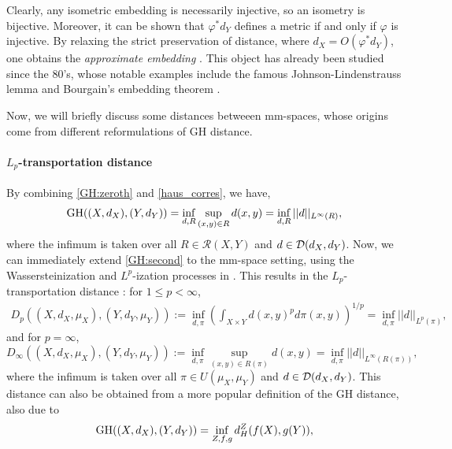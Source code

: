 Clearly, any isometric embedding is necessarily injective, so an isometry is bijective.
Moreover, it can be shown that $\varphi^* d_Y$ defines a metric if and
only if $\varphi$ is injective. By relaxing the strict preservation of distance,
where $d_X = O(\varphi^* d_Y)$, one obtains the \textit{approximate embedding} \citep{Matousek13}.
This object has already been studied since the 80's, whose notable examples include the famous
Johnson-Lindenstrauss lemma \citep{Johnson84} and Bourgain's embedding theorem \citep{Bourgain85}.

Now, we will briefly discuss some distances betweeen mm-spaces, whose origins come from
different reformulations of GH distance.
\paragraph{$L_p$-transportation distance}
By combining \eqref{GH:zeroth} and \eqref{haus_corres}, we have,
\begin{equation}
  \label{GH:second}
    \text{GH}((X,d_X), (Y,d_Y)) = \inf_{d, R} \sup_{(x,y) \in R} d(x,y) =
    \inf_{d,R} || d ||_{L^{\infty}(R)},
\end{equation}
where the infimum is taken over all $R \in \mathcal R(X,Y)$ and $d \in \mathcal D(d_X, d_Y)$.
Now, we can immediately extend \eqref{GH:second} to the mm-space setting,
using the Wassersteinization and $L^p$-ization processes in .
This results in the $L_p$-transportation distance \citep{Sturm06}: for $1 \leq p < \infty$,
\begin{equation}
  \begin{split}
    D_p((X, d_X, \mu_X), (Y, d_Y, \mu_Y))
    := \inf_{d, \pi} \left( \int_{X \times Y} d(x,y)^p d\pi(x,y) \right)^{1/p}
    = \inf_{d, \pi} || d ||_{L^p(\pi)},
  \end{split}
\end{equation}
and for $p = \infty$,
\begin{equation}
    D_{\infty}((X, d_X, \mu_X), (Y, d_Y, \mu_Y)) := \inf_{d, \pi} \sup_{(x,y) \in R(\pi)} d(x,y) =
    \inf_{ d, \pi} || d ||_{L^{\infty}(R(\pi))},
\end{equation}
where the infimum is taken over all $\pi \in U(\mu_X, \mu_Y)$ and $d \in \mathcal D(d_X, d_Y)$.
This distance can also be obtained from a more popular definition of the GH distance,
also due to \citep{Gromov99}
\begin{align}
   \label{GH:first}
  \text{GH}((X,d_X), (Y,d_Y)) = \inf_{Z, f, g} d_{ H}^{Z}(f(X), g(Y)),
\end{align}
